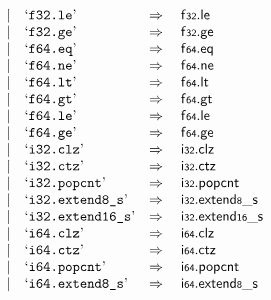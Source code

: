 $$\begin{array}[t]{@{}lrrl@{}l@{}l@{}l@{}}
& & | & \mbox{‘\texttt{f32.le}’} & \quad\Rightarrow\quad{} & \mathsf{f{\scriptstyle 32}} {.} \mathsf{le} \\
& & | & \mbox{‘\texttt{f32.ge}’} & \quad\Rightarrow\quad{} & \mathsf{f{\scriptstyle 32}} {.} \mathsf{ge} \\
& & | & \mbox{‘\texttt{f64.eq}’} & \quad\Rightarrow\quad{} & \mathsf{f{\scriptstyle 64}} {.} \mathsf{eq} \\
& & | & \mbox{‘\texttt{f64.ne}’} & \quad\Rightarrow\quad{} & \mathsf{f{\scriptstyle 64}} {.} \mathsf{ne} \\
& & | & \mbox{‘\texttt{f64.lt}’} & \quad\Rightarrow\quad{} & \mathsf{f{\scriptstyle 64}} {.} \mathsf{lt} \\
& & | & \mbox{‘\texttt{f64.gt}’} & \quad\Rightarrow\quad{} & \mathsf{f{\scriptstyle 64}} {.} \mathsf{gt} \\
& & | & \mbox{‘\texttt{f64.le}’} & \quad\Rightarrow\quad{} & \mathsf{f{\scriptstyle 64}} {.} \mathsf{le} \\
& & | & \mbox{‘\texttt{f64.ge}’} & \quad\Rightarrow\quad{} & \mathsf{f{\scriptstyle 64}} {.} \mathsf{ge} \\
& & | & \mbox{‘\texttt{i32.clz}’} & \quad\Rightarrow\quad{} & \mathsf{i{\scriptstyle 32}} {.} \mathsf{clz} \\
& & | & \mbox{‘\texttt{i32.ctz}’} & \quad\Rightarrow\quad{} & \mathsf{i{\scriptstyle 32}} {.} \mathsf{ctz} \\
& & | & \mbox{‘\texttt{i32.popcnt}’} & \quad\Rightarrow\quad{} & \mathsf{i{\scriptstyle 32}} {.} \mathsf{popcnt} \\
& & | & \mbox{‘\texttt{i32.extend8\_s}’} & \quad\Rightarrow\quad{} & \mathsf{i{\scriptstyle 32}} {.} {\mathsf{extend}}{\mathsf{{\scriptstyle 8}}}{\mathsf{\_}}{\mathsf{s}} \\
& & | & \mbox{‘\texttt{i32.extend16\_s}’} & \quad\Rightarrow\quad{} & \mathsf{i{\scriptstyle 32}} {.} {\mathsf{extend}}{\mathsf{{\scriptstyle 16}}}{\mathsf{\_}}{\mathsf{s}} \\
& & | & \mbox{‘\texttt{i64.clz}’} & \quad\Rightarrow\quad{} & \mathsf{i{\scriptstyle 64}} {.} \mathsf{clz} \\
& & | & \mbox{‘\texttt{i64.ctz}’} & \quad\Rightarrow\quad{} & \mathsf{i{\scriptstyle 64}} {.} \mathsf{ctz} \\
& & | & \mbox{‘\texttt{i64.popcnt}’} & \quad\Rightarrow\quad{} & \mathsf{i{\scriptstyle 64}} {.} \mathsf{popcnt} \\
& & | & \mbox{‘\texttt{i64.extend8\_s}’} & \quad\Rightarrow\quad{} & \mathsf{i{\scriptstyle 64}} {.} {\mathsf{extend}}{\mathsf{{\scriptstyle 8}}}{\mathsf{\_}}{\mathsf{s}} \\

\end{array}$$
